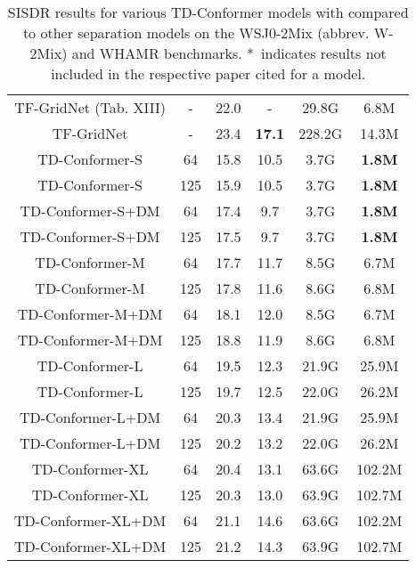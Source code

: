 \begin{table}[!ht]
{\begin{tabular}{|c|c|c|c|c|c|}
TF-GridNet (Tab.  XIII) \cite{tfgridnettasl}& - & 22.0 & - & 29.8G & 6.8M \\
TF-GridNet \cite{tfgridneticassp,tfgridnettasl}& - & 23.4 & \textbf{17.1} & 228.2G & 14.3M \\\hline
TD-Conformer-S                   & 64  & 15.8         & 10.5             & 3.7G   & \textbf{1.8M}    \\
TD-Conformer-S                   & 125 & 15.9         & 10.5             & 3.7G   & \textbf{1.8M }   \\
TD-Conformer-S+DM                & 64  & 17.4         & 9.7              & 3.7G   & \textbf{1.8M}    \\
TD-Conformer-S+DM                & 125 & 17.5         & 9.7              & 3.7G   & \textbf{1.8M}    \\ \hline
TD-Conformer-M                   & 64  & 17.7         & 11.7             & 8.5G   & 6.7M    \\
TD-Conformer-M                   & 125 & 17.8         & 11.6             & 8.6G   & 6.8M    \\
TD-Conformer-M+DM                & 64  & 18.1         & 12.0             & 8.5G   & 6.7M    \\
TD-Conformer-M+DM                & 125 & 18.8         & 11.9             & 8.6G   & 6.8M    \\ \hline
TD-Conformer-L                   & 64  & 19.5         & 12.3             & 21.9G  & 25.9M   \\
TD-Conformer-L                   & 125 & 19.7         & 12.5             & 22.0G  & 26.2M   \\
TD-Conformer-L+DM                & 64  & 20.3         & 13.4             & 21.9G  & 25.9M   \\
TD-Conformer-L+DM                & 125 & 20.2         & 13.2             & 22.0G  & 26.2M   \\ \hline
TD-Conformer-XL                  & 64  & 20.4         & 13.1             & 63.6G  & 102.2M  \\
TD-Conformer-XL                  & 125 & 20.3         & 13.0             & 63.9G  & 102.7M  \\
TD-Conformer-XL+DM               & 64  & 21.1         & {14.6}             & 63.6G  & 102.2M  \\
TD-Conformer-XL+DM               & 125 & 21.2         & 14.3             & 63.9G  & 102.7M  \\ \hline
\end{tabular}}
\caption{ SISDR results for various TD-Conformer models with  compared to other separation models on the WSJ0-2Mix (abbrev. W-2Mix) and WHAMR benchmarks.  *~indicates results not included in the respective paper cited for a model. }
\label{tab:final_table}
\end{table}
 





